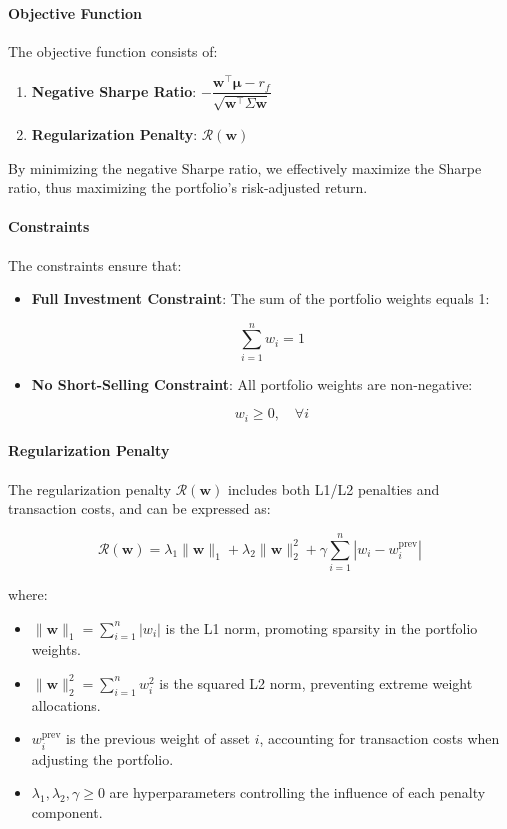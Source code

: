 \paragraph{Objective Function}

The objective function consists of:

\begin{enumerate}
    \item \textbf{Negative Sharpe Ratio}: \( -\dfrac{\mathbf{w}^\top \boldsymbol{\mu} - r_f}{\sqrt{\mathbf{w}^\top \Sigma \mathbf{w}}} \)
    \item \textbf{Regularization Penalty}: \( \mathcal{R}(\mathbf{w}) \)
\end{enumerate}

By minimizing the negative Sharpe ratio, we effectively maximize the Sharpe ratio, thus maximizing the portfolio's risk-adjusted return.

\paragraph{Constraints}

The constraints ensure that:

\begin{itemize}
    \item \textbf{Full Investment Constraint}: The sum of the portfolio weights equals 1:

    \[
    \sum_{i=1}^n w_i = 1
    \]

    \item \textbf{No Short-Selling Constraint}: All portfolio weights are non-negative:

    \[
    w_i \geq 0, \quad \forall i
    \]
\end{itemize}

\paragraph{Regularization Penalty}

The regularization penalty \( \mathcal{R}(\mathbf{w}) \) includes both L1/L2 penalties and transaction costs, and can be expressed as:

\[
\mathcal{R}(\mathbf{w}) = \lambda_1 \|\mathbf{w}\|_1 + \lambda_2 \|\mathbf{w}\|_2^2 + \gamma \sum_{i=1}^n |w_i - w_i^{\text{prev}}|
\]

where:

\begin{itemize}
    \item \( \|\mathbf{w}\|_1 = \sum_{i=1}^n |w_i| \) is the L1 norm, promoting sparsity in the portfolio weights.
    \item \( \|\mathbf{w}\|_2^2 = \sum_{i=1}^n w_i^2 \) is the squared L2 norm, preventing extreme weight allocations.
    \item \( w_i^{\text{prev}} \) is the previous weight of asset \( i \), accounting for transaction costs when adjusting the portfolio.
    \item \( \lambda_1, \lambda_2, \gamma \geq 0 \) are hyperparameters controlling the influence of each penalty component.
\end{itemize}

